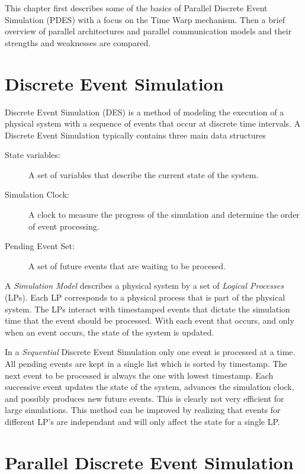 \documentclass[11pt]{book}
\begin{document}
This chapter first describes some of the basics of Parallel Discrete Event Simulation (PDES)
with a focus on the Time Warp mechanism.  Then a brief overview of parallel architectures and
parallel communication models and their strengths and weaknesses are compared.

\section{Discrete Event Simulation}

Discrete Event Simulation (DES) is a method of modeling the execution of a physical system
with a sequence of events that occur at discrete time intervals.  A Discrete Event Simulation
typically contains three main data structures

\begin{description}
    \item[State variables: ] A set of variables that describe the current state of the system.
    \item[Simulation Clock: ] A clock to measure the progress of the simulation and determine
        the order of event processing.
    \item[Pending Event Set: ] A set of future events that are waiting to be procesed.
\end{description}

\noindent
A \emph{Simulation Model} describes a physical system by a set of \emph{Logical Processes}
(LPs).  Each LP corresponds to a physical process that is part of the physical system.  The
LPs interact with timestamped events that dictate the simulation time that the event should
be processed.  With each event that occurs, and only when an event occurs, the state of the
system is updated.

In a \emph{Sequential} Discrete Event Simulation only one event is processed at a time.
All pending events are kept in a single list which is sorted by timestamp.  The next event
to be processed is always the one with lowest timestamp.  Each successive event updates the
state of the system, advances the simulation clock, and possibly produces new future events.
This is clearly not very efficient for large simulations.  This method can be improved by
realizing that events for different LP's are independant and will only affect the state for
a single LP.

\section{Parallel Discrete Event Simulation}
\end{document}
